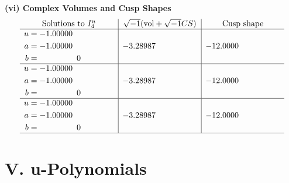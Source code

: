 \documentclass[1p]{elsarticle_modified}
\theoremstyle{definition}
\newcommand{\I}{\sqrt{-1}}
\begin{document}
\newpage\flushleft \textbf{(vi) Complex Volumes and Cusp Shapes}
$$\begin{array}{c|c|c}  
\text{Solutions to }I^u_{4}& \I (\text{vol} + \sqrt{-1}CS) & \text{Cusp shape}\\
 \hline 
\begin{aligned}
u &= -1.00000\phantom{ +0.000000I} \\
a &= -1.00000\phantom{ +0.000000I} \\
b &= \phantom{-0.000000 } 0\end{aligned}
 & -3.28987\phantom{ +0.000000I} & -12.0000\phantom{ +0.000000I} \\ \hline\begin{aligned}
u &= -1.00000\phantom{ +0.000000I} \\
a &= -1.00000\phantom{ +0.000000I} \\
b &= \phantom{-0.000000 } 0\end{aligned}
 & -3.28987\phantom{ +0.000000I} & -12.0000\phantom{ +0.000000I} \\ \hline\begin{aligned}
u &= -1.00000\phantom{ +0.000000I} \\
a &= -1.00000\phantom{ +0.000000I} \\
b &= \phantom{-0.000000 } 0\end{aligned}
 & -3.28987\phantom{ +0.000000I} & -12.0000\phantom{ +0.000000I}\\
 \hline 
 \end{array}$$\newpage
\newpage\renewcommand{\arraystretch}{1}
\centering \section*{ V. u-Polynomials}
\end{document}
